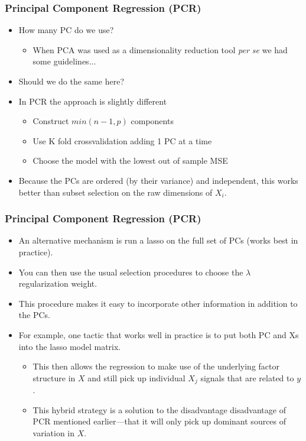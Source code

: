 \documentclass[
  shownotes,
  xcolor={svgnames},
  hyperref={colorlinks,citecolor=DarkBlue,linkcolor=DarkRed,urlcolor=DarkBlue}
  , aspectratio=169]{beamer}
\begin{document}
\begin{frame}[fragile]
\frametitle{ Principal Component Regression (PCR)}


\begin{itemize}
\item How many PC do we use?
\medskip
  \begin{itemize}
    \item When PCA was used as a dimensionality reduction tool {\it per se} we had some guidelines...
  \end{itemize}
\medskip
\item Should we do the same here?
\medskip
\pause
\item In PCR the approach is slightly different
\begin{itemize}

  \item Construct $min(n-1,p)$ components
  \medskip 
  \item Use K fold crossvalidation adding 1 PC at a time
  \medskip
  \item Choose the model with the lowest out of sample MSE
\end{itemize}
\item Because the PCs are ordered (by their variance) and independent, this works better than subset selection on the raw dimensions of $X_i$. 

\end{itemize}

\end{frame}
\begin{frame}[fragile]
\frametitle{ Principal Component Regression (PCR)}


\begin{itemize}
  \item  An alternative mechanism is run a lasso  on the full set of PCs (works best in practice). 
  \medskip
\item You can then use the usual selection procedures to choose the $\lambda$ regularization weight. 
\medskip
\item This procedure makes it easy to incorporate other information in addition to the PCs. 
\medskip
\item For example, one tactic that works well in practice is to put both PC and Xs into the lasso model matrix. 
  \begin{itemize}
    \medskip
    \item This then allows the regression to make use of the underlying factor structure in $X$ and still pick up individual $X_j$ signals that are related to $y$. 
    \medskip
    \item This hybrid strategy is a solution to the disadvantage disadvantage of PCR mentioned earlier—that it will only pick up dominant sources of variation in $X$. 
  \end{itemize}


\end{itemize}

\end{frame}
\end{document}
